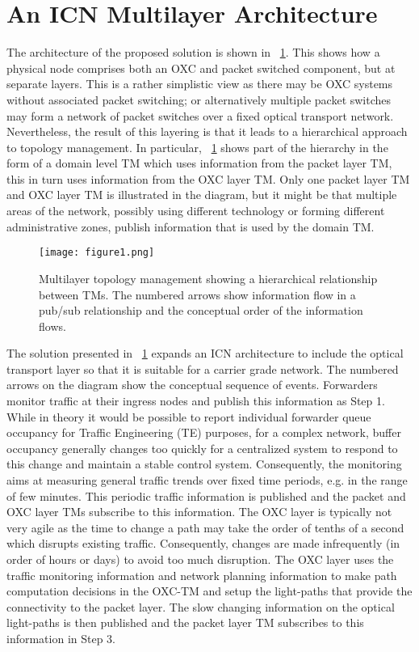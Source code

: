 \documentclass[journal]{IEEEtran}
\begin{document}
\section{An ICN Multilayer Architecture}\label{sec:ml-icn}
The architecture of the proposed solution is shown in \figurename~\ref{fig:mlt}. This shows how a physical node comprises both an OXC and packet switched component, but at separate layers. This is a rather simplistic view as there may be OXC systems without associated packet switching; or alternatively multiple packet switches may form a network of packet switches over a fixed optical transport network. Nevertheless, the result of this layering is that it leads to a hierarchical approach to topology management. In particular, \figurename~\ref{fig:mlt} shows part of the hierarchy in the form of a domain level TM which uses information from the packet layer TM, this in turn uses information from the OXC layer TM. Only one packet layer TM and OXC layer TM is illustrated in the diagram, but it might be that multiple areas of the network, possibly using different technology or forming different administrative zones, publish information that is used by the domain TM. 
\begin{figure}[tb]
 \centering
 \texttt{[image: figure1.png]}
 \caption{ Multilayer topology management showing a hierarchical relationship between TMs. The numbered arrows show information flow in a pub/sub relationship and the conceptual order of the information flows.}
 \label{fig:mlt}
\end{figure}
The solution presented in \figurename~\ref{fig:mlt} expands an ICN architecture to include the optical transport layer so that it is suitable for a carrier grade network. The numbered arrows on the diagram show the conceptual sequence of events. Forwarders monitor traffic at their ingress nodes and publish this information as Step 1. While in theory it would be possible to report individual forwarder queue occupancy for Traffic Engineering (TE) purposes, for a complex network, buffer occupancy generally changes too quickly for a centralized system to respond to this change and maintain a stable control system. 
Consequently, the monitoring aims at measuring general traffic trends over fixed time periods, e.g. in the range of few minutes.
This periodic traffic information is published and the packet and OXC layer TMs subscribe to this information. The OXC layer is typically not very agile as the time to change a path may take the order of tenths of a second which disrupts existing traffic. Consequently, changes are made infrequently (in order of hours or days) to avoid too much disruption. The OXC layer uses the traffic monitoring information and network planning information to make path computation decisions in the OXC-TM and setup the light-paths that provide the connectivity to the packet layer. The slow changing information on the optical light-paths is then published and the packet layer TM subscribes to this information in Step 3.
\end{document}
